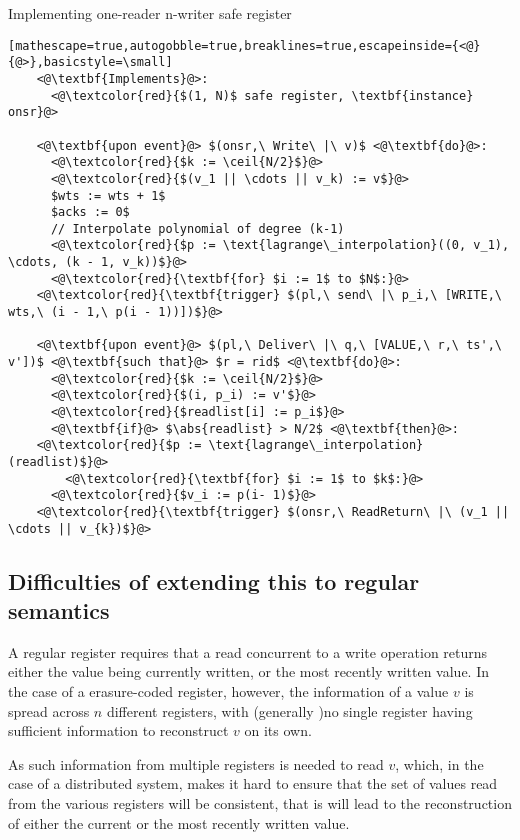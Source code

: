 \documentclass[a4paper]{scrreprt}
\DeclarePairedDelimiter{\ceil}{\lceil}{\rceil}
\DeclarePairedDelimiter\abs{\lvert}{\rvert}
\begin{document}
\begin{library}{Implementing one-reader n-writer safe register}
  \begin{lstlisting}[mathescape=true,autogobble=true,breaklines=true,escapeinside={<@}{@>},basicstyle=\small]
    <@\textbf{Implements}@>:
      <@\textcolor{red}{$(1, N)$ safe register, \textbf{instance} onsr}@>

    <@\textbf{upon event}@> $(onsr,\ Write\ |\ v)$ <@\textbf{do}@>:
      <@\textcolor{red}{$k := \ceil{N/2}$}@>
      <@\textcolor{red}{$(v_1 || \cdots || v_k) := v$}@>
      $wts := wts + 1$
      $acks := 0$
      // Interpolate polynomial of degree (k-1)
      <@\textcolor{red}{$p := \text{lagrange\_interpolation}((0, v_1), \cdots, (k - 1, v_k))$}@>
      <@\textcolor{red}{\textbf{for} $i := 1$ to $N$:}@>
	<@\textcolor{red}{\textbf{trigger} $(pl,\ send\ |\ p_i,\ [WRITE,\ wts,\ (i - 1,\ p(i - 1))])$}@>

    <@\textbf{upon event}@> $(pl,\ Deliver\ |\ q,\ [VALUE,\ r,\ ts',\ v'])$ <@\textbf{such that}@> $r = rid$ <@\textbf{do}@>:
      <@\textcolor{red}{$k := \ceil{N/2}$}@>
      <@\textcolor{red}{$(i, p_i) := v'$}@>
      <@\textcolor{red}{$readlist[i] := p_i$}@>
      <@\textbf{if}@> $\abs{readlist} > N/2$ <@\textbf{then}@>:
	<@\textcolor{red}{$p := \text{lagrange\_interpolation}(readlist)$}@>
        <@\textcolor{red}{\textbf{for} $i := 1$ to $k$:}@>
	  <@\textcolor{red}{$v_i := p(i- 1)$}@>
	<@\textcolor{red}{\textbf{trigger} $(onsr,\ ReadReturn\ |\ (v_1 || \cdots || v_{k})$}@>
  \end{lstlisting}
\end{library}

\subsection{Difficulties of extending this to regular semantics}

A regular register requires that a read concurrent to a write operation returns
either the value being currently written, or the most recently written value.
In the case of a erasure-coded register, however, the information of a value
$v$ is spread across $n$ different registers, with (generally )no single
register having sufficient information to reconstruct $v$ on its own.

As such information from multiple registers is needed to read $v$, which, in
the case of a distributed system, makes it hard to ensure that the set of
values read from the various registers will be consistent, that is will lead to
the reconstruction of either the current or the most recently written value.
\end{document}
